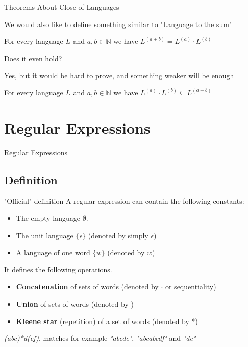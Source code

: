 \documentclass{beamer}
\newcommand{\languagesymbol}{L}
\newcommand{\languagei}[1]{\languagesymbol_{#1}}
\newcommand{\pow}[2]{#1^{#2}}
\newcommand{\close}[2]{\pow{#1}{(#2)}}
\newcommand{\languageclose}[1]{\close{\languagesymbol}{#1}}
\newcommand{\wordsymbol}{w}
\newcommand{\emptyword}{\epsilon}
\newcommand{\concatop}{\cdot}
\newcommand{\unitlang}{\{\emptyword\}}
\newcommand{\setof}[1]{\{#1\}}
\newcommand{\nats}{\mathbb{N}}
\begin{document}
\begin{frame}{Theorems About Close of Languages}
	
	We would also like to define something similar to "Language to the sum"
	
	\begin{lemma}
		\label{lem:sumCloseSame}
		For every language $\languagei{}$ and $a,b \in \nats$ we have $\languageclose{a+b} = \languageclose{a} \concatop \languageclose{b} $
	\end{lemma}
	 {
		Does it even hold?
		}
	
	 {Yes, but it would be hard to prove, and something weaker will be enough}
	
	 {
\begin{lemma}
	\label{lem:sumClose}
	For every language $\languagei{}$ and $a,b \in \nats$ we have $\languageclose{a} \concatop \languageclose{b} \subseteq \languageclose{a+b}$
\end{lemma}
		
		}
\end{frame}

\section{Regular Expressions}

\begin{frame}
	\Huge{\centerline{Regular Expressions}}
\end{frame}

\subsection{Definition}

\begin{frame}{"Official" definition}
	 A regular expression can contain the following constants:
	 \begin{itemize}
	 	\item The empty language $\emptyset$.
	 	\item The unit language $\unitlang$ (denoted by simply $\emptyword$)
	 	\item A language of one word $\setof{\wordsymbol}$ (denoted by $\wordsymbol$)
	 \end{itemize}
	 
	 It defines the following operations.
	 \begin{itemize}
	 	\item \textbf{Concatenation} of sets of words (denoted by $\concatop$ or sequentiality)
	 	\item \textbf{Union} of sets of words (denoted by \textbar)
	 	\item \textbf{Kleene star} (repetition) of a set of words (denoted by *)
	 \end{itemize}
	 
	 \begin{example}
	 	\textit{(abc)*d(e\textbar f)}, matches for example \textit{"abcde"}, \textit{"abcabcdf"} and \textit{"de"}
	 \end{example}
\end{frame}
\end{document}
